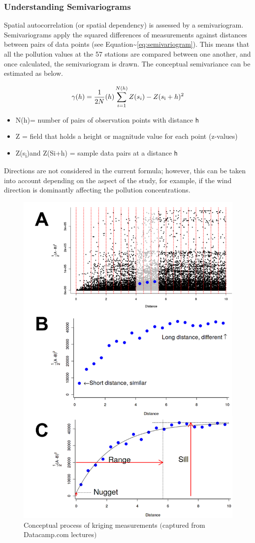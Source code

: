 \hypertarget{understanding-semivariograms}{%
\subsubsection{Understanding
Semivariograms}\label{understanding-semivariograms}}

Spatial autocorrelation (or spatial dependency) is assessed by a
semivariogram. Semivariograms apply the squared differences of
measurements against distances between pairs of data points (see
Equation\textasciitilde{}\ref{eq:semivariogram}). This means that all
the pollution values at the 57 stations are compared between one
another, and once calculated, the semivariogram is drawn. The conceptual
semivariance can be estimated as below.

\begin{equation}
\label{eq:semivariogram}
\gamma(h)= \frac{1}{2N}(h) \sum_{i=1}^{N(h)}{Z(s_i) - Z(s\textsubscript{i} + h)\textsuperscript{2}}
\end{equation}

\begin{itemize}
 \setlength\itemsep{0em}
    \item N(h)= number of pairs of observation points with distance \texttt{h}
    \item Z = field that holds a height or magnitude value for each point (z-values)
    \item Z(s\textsubscript{i})and Z(Si+h) = sample data pairs at a distance \texttt{h} \citep{Luo2008}
\end{itemize}

Directions are not considered in the current formula; however, this can
be taken into account depending on the aspect of the study, for example,
if the wind direction is dominantly affecting the pollution
concentrations.

\begin{figure}[hbt!]
\begin{center} 
  \includegraphics[width=.5\textwidth]{Figures/semivariogram.png}
\end{center} 
\caption[Conceptual process of kriging measurements]{Conceptual process of kriging measurements $($captured from Datacamp.com lectures$)$} 
\label{fig:semivariogram} 
\end{figure}

